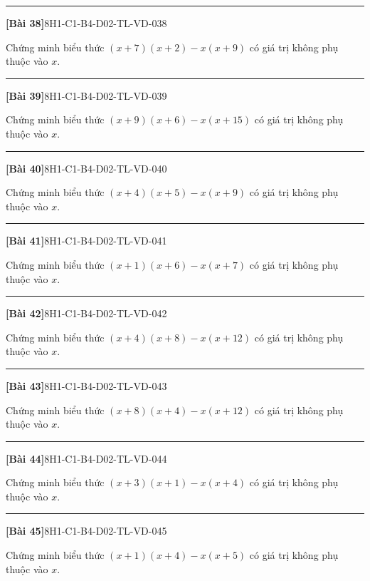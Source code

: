 \documentclass[12pt,a4paper]{article}
\newif\ifloigiai
\newenvironment{cauhoi}[2]{%
  \par\medskip\noindent\rule{\textwidth}{0.4pt}\par\nopagebreak
  \noindent\textbf{[#1]}\hfill{\scriptsize\ttfamily #2}\par\nopagebreak\smallskip}{\par}
\newcommand{\loigiai}[1]{\ifloigiai\par\smallskip\noindent\textit{Lời giải.} #1\par\fi}
\begin{document}
\begin{cauhoi}{Bài 38}{8H1-C1-B4-D02-TL-VD-038}
Chứng minh biểu thức $(x+7)(x+2)-x(x+9)$ có giá trị không phụ thuộc vào $x$.
\loigiai{$(x+7)(x+2)-x(x+9)=x^{2}+7x+2x+14-x^{2}-9x=14$. Kết quả là hằng số nên biểu thức không phụ thuộc vào $x$.}
\end{cauhoi}
\begin{cauhoi}{Bài 39}{8H1-C1-B4-D02-TL-VD-039}
Chứng minh biểu thức $(x+9)(x+6)-x(x+15)$ có giá trị không phụ thuộc vào $x$.
\loigiai{$(x+9)(x+6)-x(x+15)=x^{2}+9x+6x+54-x^{2}-15x=54$. Kết quả là hằng số nên biểu thức không phụ thuộc vào $x$.}
\end{cauhoi}
\begin{cauhoi}{Bài 40}{8H1-C1-B4-D02-TL-VD-040}
Chứng minh biểu thức $(x+4)(x+5)-x(x+9)$ có giá trị không phụ thuộc vào $x$.
\loigiai{$(x+4)(x+5)-x(x+9)=x^{2}+4x+5x+20-x^{2}-9x=20$. Kết quả là hằng số nên biểu thức không phụ thuộc vào $x$.}
\end{cauhoi}
\begin{cauhoi}{Bài 41}{8H1-C1-B4-D02-TL-VD-041}
Chứng minh biểu thức $(x+1)(x+6)-x(x+7)$ có giá trị không phụ thuộc vào $x$.
\loigiai{$(x+1)(x+6)-x(x+7)=x^{2}+x+6x+6-x^{2}-7x=6$. Kết quả là hằng số nên biểu thức không phụ thuộc vào $x$.}
\end{cauhoi}
\begin{cauhoi}{Bài 42}{8H1-C1-B4-D02-TL-VD-042}
Chứng minh biểu thức $(x+4)(x+8)-x(x+12)$ có giá trị không phụ thuộc vào $x$.
\loigiai{$(x+4)(x+8)-x(x+12)=x^{2}+4x+8x+32-x^{2}-12x=32$. Kết quả là hằng số nên biểu thức không phụ thuộc vào $x$.}
\end{cauhoi}
\begin{cauhoi}{Bài 43}{8H1-C1-B4-D02-TL-VD-043}
Chứng minh biểu thức $(x+8)(x+4)-x(x+12)$ có giá trị không phụ thuộc vào $x$.
\loigiai{$(x+8)(x+4)-x(x+12)=x^{2}+8x+4x+32-x^{2}-12x=32$. Kết quả là hằng số nên biểu thức không phụ thuộc vào $x$.}
\end{cauhoi}
\begin{cauhoi}{Bài 44}{8H1-C1-B4-D02-TL-VD-044}
Chứng minh biểu thức $(x+3)(x+1)-x(x+4)$ có giá trị không phụ thuộc vào $x$.
\loigiai{$(x+3)(x+1)-x(x+4)=x^{2}+3x+x+3-x^{2}-4x=3$. Kết quả là hằng số nên biểu thức không phụ thuộc vào $x$.}
\end{cauhoi}
\begin{cauhoi}{Bài 45}{8H1-C1-B4-D02-TL-VD-045}
Chứng minh biểu thức $(x+1)(x+4)-x(x+5)$ có giá trị không phụ thuộc vào $x$.
\loigiai{$(x+1)(x+4)-x(x+5)=x^{2}+x+4x+4-x^{2}-5x=4$. Kết quả là hằng số nên biểu thức không phụ thuộc vào $x$.}
\end{cauhoi}
\end{document}
